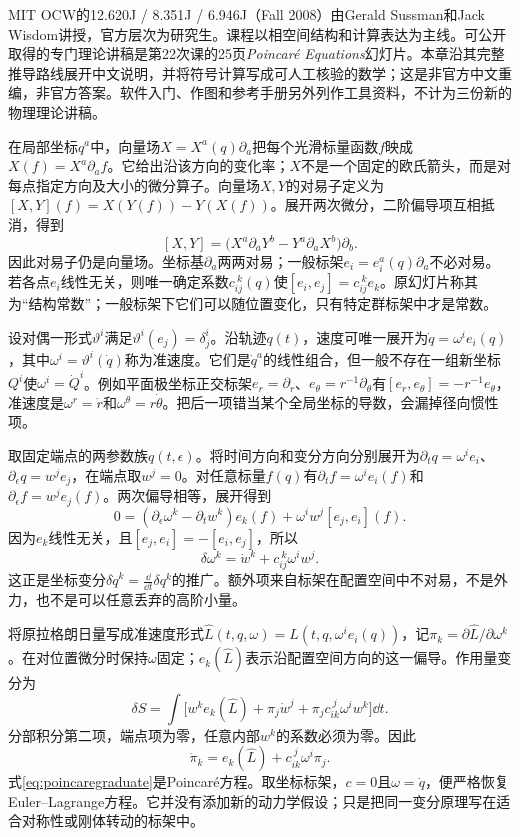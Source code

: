 \label{ch:poincaregraduate}
MIT OCW的12.620J / 8.351J / 6.946J（Fall 2008）由Gerald Sussman和Jack Wisdom讲授，官方层次为研究生。课程以相空间结构和计算表达为主线。可公开取得的专门理论讲稿是第22次课的25页\textit{Poincaré Equations}幻灯片。本章沿其完整推导路线展开中文说明，并将符号计算写成可人工核验的数学；这是非官方中文重编，非官方答案。软件入门、作图和参考手册另外列作工具资料，不计为三份新的物理理论讲稿。

在局部坐标$q^a$中，向量场$X=X^a(q)\partial_a$把每个光滑标量函数$f$映成$X(f)=X^a\partial_af$。它给出沿该方向的变化率；$X$不是一个固定的欧氏箭头，而是对每点指定方向及大小的微分算子。向量场$X,Y$的对易子定义为$[X,Y](f)=X(Y(f))-Y(X(f))$。展开两次微分，二阶偏导项互相抵消，得到
\[
 [X,Y]=\bigl(X^a\partial_aY^b-Y^a\partial_aX^b\bigr)\partial_b.
\]
因此对易子仍是向量场。坐标基$\partial_a$两两对易；一般标架$e_i=e_i^a(q)\partial_a$不必对易。若各点$e_i$线性无关，则唯一确定系数$c_{ij}^{\ k}(q)$使$[e_i,e_j]=c_{ij}^{\ k}e_k$。原幻灯片称其为“结构常数”；一般标架下它们可以随位置变化，只有特定群标架中才是常数。

设对偶一形式$\vartheta^i$满足$\vartheta^i(e_j)=\delta^i_j$。沿轨迹$q(t)$，速度可唯一展开为$\dot q=\omega^ie_i(q)$，其中$\omega^i=\vartheta^i(\dot q)$称为准速度。它们是$\dot q^a$的线性组合，但一般不存在一组新坐标$Q^i$使$\omega^i=\dot Q^i$。例如平面极坐标正交标架$e_r=\partial_r$、$e_\theta=r^{-1}\partial_\theta$有$[e_r,e_\theta]=-r^{-1}e_\theta$，准速度是$\omega^r=\dot r$和$\omega^\theta=r\dot\theta$。把后一项错当某个全局坐标的导数，会漏掉径向惯性项。

取固定端点的两参数族$q(t,\epsilon)$。将时间方向和变分方向分别展开为$\partial_tq=\omega^ie_i$、$\partial_\epsilon q=w^je_j$，在端点取$w^j=0$。对任意标量$f(q)$有$\partial_tf=\omega^ie_i(f)$和$\partial_\epsilon f=w^je_j(f)$。两次偏导相等，展开得到
\[
 0=(\partial_\epsilon\omega^k-\partial_tw^k)e_k(f)
 +\omega^iw^j[e_j,e_i](f).
\]
因为$e_k$线性无关，且$[e_j,e_i]=-[e_i,e_j]$，所以
\[
 \delta\omega^k=\dot w^k+c_{ij}^{\ k}\omega^iw^j.
\]
这正是坐标变分$\delta\dot q^k=\frac{\dd}{\dd t}\delta q^k$的推广。额外项来自标架在配置空间中不对易，不是外力，也不是可以任意丢弃的高阶小量。

将原拉格朗日量写成准速度形式$\widehat L(t,q,\omega)=L(t,q,\omega^ie_i(q))$，记$\pi_k=\partial\widehat L/\partial\omega^k$。在对位置微分时保持$\omega$固定；$e_k(\widehat L)$表示沿配置空间方向的这一偏导。作用量变分为
\[
 \delta S=\int\bigl[w^ke_k(\widehat L)+\pi_j\dot w^j
 +\pi_jc_{ik}^{\ j}\omega^iw^k\bigr]\dd t.
\]
分部积分第二项，端点项为零，任意内部$w^k$的系数必须为零。因此
\begin{equation}
 \dot\pi_k=e_k(\widehat L)+c_{ik}^{\ j}\omega^i\pi_j.
 \label{eq:poincaregraduate}
\end{equation}
式\eqref{eq:poincaregraduate}是Poincaré方程。取坐标标架，$c=0$且$\omega=\dot q$，便严格恢复Euler--Lagrange方程。它并没有添加新的动力学假设；只是把同一变分原理写在适合对称性或刚体转动的标架中。

